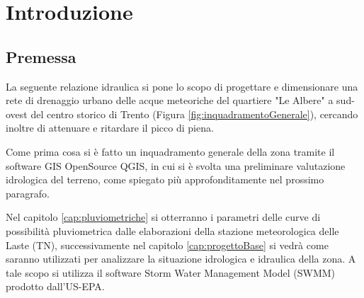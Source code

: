 \chapter{Introduzione}
\section{Premessa}
La seguente relazione idraulica si pone lo scopo di progettare e dimensionare una rete di drenaggio urbano delle acque meteoriche del quartiere "Le Albere" a sud-ovest del centro storico di Trento (Figura \ref{fig:inquadramentoGenerale}), cercando inoltre di attenuare e ritardare il picco di piena.


Come prima cosa si è fatto un inquadramento generale della zona tramite il software GIS OpenSource QGIS, in cui si è svolta una preliminare valutazione idrologica del terreno, come spiegato più approfonditamente nel prossimo paragrafo.




Nel capitolo \ref{cap:pluviometriche} si otterranno i parametri delle curve di possibilità pluviometrica dalle elaborazioni della stazione meteorologica delle Laste (TN), successivamente nel capitolo \ref{cap:progettoBase} si vedrà come saranno utilizzati per analizzare la situazione idrologica e idraulica della zona. A tale scopo si utilizza il software Storm Water Management Model (SWMM) prodotto dall'US-EPA.

